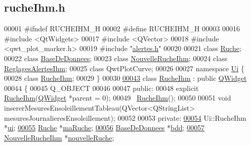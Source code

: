 \hypertarget{ruche_ihm_8h_source}{}\subsection{ruche\+Ihm.\+h}
\label{ruche_ihm_8h_source}

\begin{DoxyCode}
00001 \textcolor{preprocessor}{#ifndef RUCHEIHM\_H}
00002 \textcolor{preprocessor}{#define RUCHEIHM\_H}
00003 
00016 \textcolor{preprocessor}{#include <QtWidgets>}
00017 \textcolor{preprocessor}{#include <QVector>}
00018 \textcolor{preprocessor}{#include <qwt\_plot\_marker.h>}
00019 \textcolor{preprocessor}{#include "\hyperlink{alertes_8h}{alertes.h}"}
00020 
00021 \textcolor{keyword}{class }\hyperlink{class_ruche}{Ruche};
00022 \textcolor{keyword}{class }\hyperlink{class_base_de_donnees}{BaseDeDonnees};
00023 \textcolor{keyword}{class }\hyperlink{class_nouvelle_ruche_ihm}{NouvelleRucheIhm};
00024 \textcolor{keyword}{class }\hyperlink{class_reglages_alertes_ihm}{ReglagesAlertesIhm};
00025 \textcolor{keyword}{class }QwtPlotCurve;
00026 
00027 \textcolor{keyword}{namespace }\hyperlink{namespace_ui}{Ui} \{
00028 \textcolor{keyword}{class }\hyperlink{class_ruche_ihm}{RucheIhm};
00029 \}
00030 
\hyperlink{class_ruche_ihm}{00043} \textcolor{keyword}{class }\hyperlink{class_ruche_ihm}{RucheIhm} : \textcolor{keyword}{public} \hyperlink{class_q_widget}{QWidget}
00044 \{
00045     Q\_OBJECT
00046 
00047 \textcolor{keyword}{public}:
00048     \textcolor{keyword}{explicit} \hyperlink{class_ruche_ihm}{RucheIhm}(\hyperlink{class_q_widget}{QWidget} *parent = 0);
00049     ~\hyperlink{class_ruche_ihm}{RucheIhm}();
00050 
00051     \textcolor{keywordtype}{void} insererMesuresEnsoleillementTableau(QVector<QStringList> mesuresJournalieresEnsoleillement);
00052 
00053 \textcolor{keyword}{private}:
\hyperlink{class_ruche_ihm_a64786058bd7f88ca2f1e9743bb27c25b}{00054}     Ui::RucheIhm *\hyperlink{class_ruche_ihm_a64786058bd7f88ca2f1e9743bb27c25b}{ui}; 
\hyperlink{class_ruche_ihm_a43a6b1fa31f4fba58d919daae3707b38}{00055}     \hyperlink{class_ruche}{Ruche} *\hyperlink{class_ruche_ihm_a43a6b1fa31f4fba58d919daae3707b38}{maRuche}; 
\hyperlink{class_ruche_ihm_a0851936fe212e8d40538264f09749153}{00056}     \hyperlink{class_base_de_donnees}{BaseDeDonnees} *\hyperlink{class_ruche_ihm_a0851936fe212e8d40538264f09749153}{bdd}; 
\hyperlink{class_ruche_ihm_a3a27b7af842244c6db3623f5f256bed5}{00057}     \hyperlink{class_nouvelle_ruche_ihm}{NouvelleRucheIhm} *\hyperlink{class_ruche_ihm_a3a27b7af842244c6db3623f5f256bed5}{nouvelleRuche};  

\end{DoxyCode}
